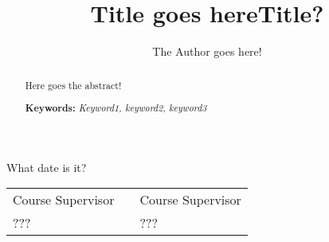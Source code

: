 \documentclass[12pt]{llncs} %
\begin{document}
%
\frontmatter          %
%
\pagestyle{headings}  %
%

\author{The Author goes here!}
\title{Title goes here}
\maketitle

\begin{flushright}\noindent
What date is it?
\end{flushright}
\vspace{1cm}

\begin{tabular}{p{4cm}p{4cm}p{4cm}}
Course Supervisor & & Course Supervisor \tabularnewline 
??? & & ??? \tabularnewline 
\end{tabular} 



\vspace{1cm}
\begin{abstract}
Here goes the abstract!\\
\vspace{1cm}
 
\textbf{Keywords: }
\textit{Keyword1, keyword2, keyword3}
\end{abstract}

%
\tableofcontents
%
\mainmatter              %
%
\title{Title?} 
%



\clearpage




\printindex

\pagestyle{empty}


\clearpage

%
\end{document}
